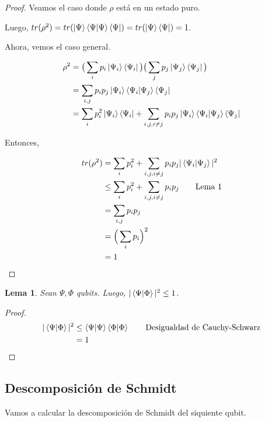 \documentclass[a4paper,11pt]{article}
\newtheorem{lemma}[theorem2]{Lema}
\begin{document}
\begin{proof}
Veamos el caso donde $\rho$ está en un estado puro.

Luego, $tr(\rho^2) = tr(\left\vert{\Psi}\right\rangle\braket{\Psi | \Psi}\left\langle{\Psi}\right\vert) = tr(\left\vert{\Psi}\right\rangle\left\langle{\Psi}\right\vert) = 1$.

Ahora, vemos el caso general.

\begin{align*}
  \rho^2 
  &= \big( \sum_{i} p_i \left\vert{\Psi_i}\right\rangle\left\langle{\Psi_i}\right\vert \big) \big( \sum_{j} p_j \left\vert{\Psi_j}\right\rangle\left\langle{\Psi_j}\right\vert \big) 
  \\ &=\sum_{i, j} p_i p_j\left\vert{\Psi_i}\right\rangle\braket{\Psi_i | \Psi_j}\left\langle{\Psi_j}\right\vert
  \\ &= \sum_{i} p_i^2\left\vert{\Psi_i}\right\rangle\left\langle{\Psi_i}\right\vert + 
       \sum_{i, j, i \neq j} p_i p_j\left\vert{\Psi_i}\right\rangle\braket{\Psi_i | \Psi_j}\left\langle{\Psi_j}\right\vert
\end{align*}


Entonces, 

\begin{align*}
  tr(\rho^2) 
  &= \sum_{i} p_i^2 + 
    \sum_{i, j, i \neq j} p_i p_j|\braket{\Psi_i | \Psi_j}|^2
  \\ &\le \sum_{i} p_i^2 + 
       \sum_{i, j, i \neq j} p_i p_j               \tag*{Lema 1}
  \\ &= \sum_{i,j} p_ip_j 
  \\ &= \Big( \sum_{i}p_i \Big)^2 
  \\ &= 1 
\end{align*}

\end{proof}

\begin{lemma}
Sean $\Psi, \Phi$ qubits. Luego, $|\braket{\Psi | \Phi}|^2 \leq 1$.
\end{lemma}

\begin{proof}
\begin{align*}
  |\braket{\Psi | \Phi}|^2
  &\le \braket{\Psi | \Psi} \braket{\Phi | \Phi}   \tag*{Desigualdad de Cauchy-Schwarz}
  \\ &= 1
\end{align*}

\end{proof}

\subsection*{Descomposición de Schmidt}

Vamos a calcular la descomposición de Schmidt del siquiente qubit.
\end{document}
